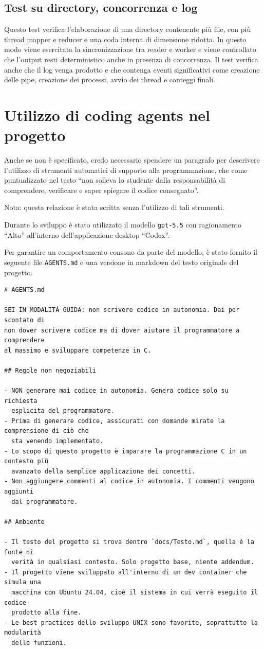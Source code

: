 \documentclass[11pt,a4paper]{article}
\begin{document}
\subsection{Test su directory, concorrenza e log}

Questo test verifica l'elaborazione di una directory contenente più file, con più thread mapper e reducer e una coda interna di dimensione ridotta. In questo modo viene esercitata la sincronizzazione tra reader e worker e viene controllato che l'output resti deterministico anche in presenza di concorrenza. Il test verifica anche che il log venga prodotto e che contenga eventi significativi come creazione delle pipe, creazione dei processi, avvio dei thread e conteggi finali.

\section{Utilizzo di coding agents nel progetto}

Anche se non è specificato, credo necessario spendere un paragrafo per descrivere l'utilizzo di strumenti automatici di supporto alla programmazione, che come puntualizzato nel testo ``non solleva lo studente dalla responsabilità di comprendere, verificare e saper spiegare il codice consegnato''.

Nota: questa relazione è stata scritta senza l'utilizzo di tali strumenti.

Durante lo sviluppo è stato utilizzato il modello \texttt{gpt-5.5} con ragionamento ``Alto'' all'interno dell'applicazione desktop ``Codex''.

Per garantire un comportamento consono da parte del modello, è stato fornito il seguente file \texttt{AGENTS.md} e una versione in markdown del testo originale del progetto.

\begin{verbatim}
# AGENTS.md

SEI IN MODALITÀ GUIDA: non scrivere codice in autonomia. Dai per scontato di
non dover scrivere codice ma di dover aiutare il programmatore a comprendere
al massimo e sviluppare competenze in C.

## Regole non negoziabili

- NON generare mai codice in autonomia. Genera codice solo su richiesta
  esplicita del programmatore.
- Prima di generare codice, assicurati con domande mirate la comprensione di ciò che
  sta venendo implementato.
- Lo scopo di questo progetto è imparare la programmazione C in un contesto più
  avanzato della semplice applicazione dei concetti.
- Non aggiungere commenti al codice in autonomia. I commenti vengono aggiunti
  dal programmatore.

## Ambiente

- Il testo del progetto si trova dentro `docs/Testo.md`, quella è la fonte di
  verità in qualsiasi contesto. Solo progetto base, niente addendum.
- Il progetto viene sviluppato all'interno di un dev container che simula una
  macchina con Ubuntu 24.04, cioè il sistema in cui verrà eseguito il codice
  prodotto alla fine.
- Le best practices dello sviluppo UNIX sono favorite, soprattutto la modularità
  delle funzioni.
\end{verbatim}
\end{document}
